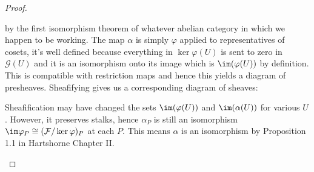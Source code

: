 \begin{problemset}
\begin{proof}
\begin{enumerate}[(a)]
\begin{center}
				\end{center}
				by the first isomorphism theorem of whatever abelian category in which we happen to be working. The map $\alpha$ is simply $\varphi$ applied to representatives of cosets, it's well defined because everything in $\ker\varphi(U)$ is sent to zero in $\mathcal G(U)$ and it is an isomorphism onto its image which is $\im(\varphi(U))$ by definition. This is compatible with restriction maps and hence this yields a diagram of presheaves. Sheafifying gives us a corresponding diagram of sheaves:
				\begin{center}
				\end{center}
				Sheafification may have changed the sets $\im(\varphi(U))$ and $\im(\alpha(U))$ for various $U$. However, it preserves stalks, hence $\alpha_P$ is still an isomorphism $\im\varphi_P \cong (\mathcal F/\ker \varphi)_P$ at each $P$. This means $\alpha$ is an isomorphism by Proposition 1.1 in Hartshorne Chapter II.


\end{enumerate}
\end{proof}
\end{problemset}
